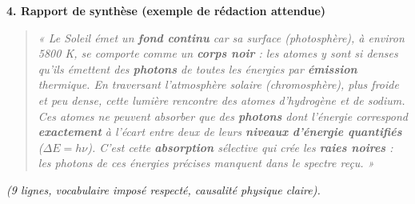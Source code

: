 \documentclass[11pt]{article}
\begin{document}
\begin{exoresolu}
\medskip
\noindent\textbf{4. Rapport de synthèse (exemple de rédaction attendue)}
\medskip
\begin{quote}
\textit{« Le Soleil émet un \textbf{fond continu} car sa surface (photosphère), à environ 5800 K, se comporte comme un \textbf{corps noir} : les atomes y sont si denses qu'ils émettent des \textbf{photons} de toutes les énergies par \textbf{émission} thermique. En traversant l'atmosphère solaire (chromosphère), plus froide et peu dense, cette lumière rencontre des atomes d'hydrogène et de sodium. Ces atomes ne peuvent absorber que des \textbf{photons} dont l'énergie correspond \textbf{exactement} à l'écart entre deux de leurs \textbf{niveaux d'énergie quantifiés} ($\Delta E = h\nu$). C'est cette \textbf{absorption} sélective qui crée les \textbf{raies noires} : les photons de ces énergies précises manquent dans le spectre reçu. »} 
\end{quote}
\emph{(9 lignes, vocabulaire imposé respecté, causalité physique claire).}
\end{exoresolu}
\end{document}

